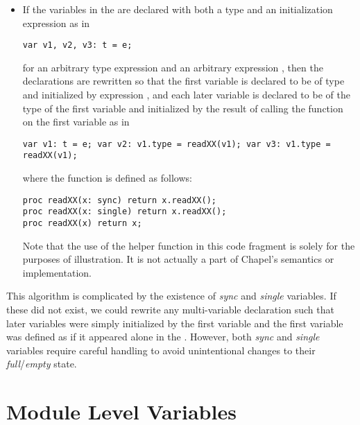 \begin{itemize}
\item If the variables in the  are declared
with both a type and an initialization expression as in
\begin{chapel}
\begin{verbatim}
var v1, v2, v3: t = e;
\end{verbatim}
\end{chapel}
for an arbitrary type expression  and an arbitrary
expression , then the declarations are rewritten so that the
first variable is declared to be of type  and initialized by
expression , and each later variable is declared to be of the
type of the first variable and initialized by the result of calling
the function  on the first variable as in
\begin{chapel}
\begin{verbatim}
var v1: t = e; var v2: v1.type = readXX(v1); var v3: v1.type = readXX(v1);
\end{verbatim}
\end{chapel}
where the function  is defined as follows:
\begin{chapel}
\begin{verbatim}
proc readXX(x: sync) return x.readXX();
proc readXX(x: single) return x.readXX();
proc readXX(x) return x;
\end{verbatim}
\end{chapel}
Note that the use of the helper function 
in this code fragment is solely for the purposes of illustration.
It is not actually a part of Chapel's semantics or implementation.
\end{itemize}

\begin{rationale}
This algorithm is complicated by the existence of \emph{sync}
and \emph{single} variables.  If these did not exist, we could rewrite
any multi-variable declaration such that later variables were simply
initialized by the first variable and the first variable was defined
as if it appeared alone in the .  However,
both \emph{sync} and \emph{single} variables require careful handling
to avoid unintentional changes to their \emph{full}/\emph{empty}
state.
\end{rationale}

\section{Module Level Variables}
\label{Module_Level_Variables}

